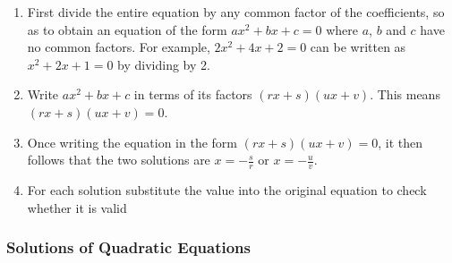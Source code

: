         
        \label{m39247*id150020}\begin{enumerate}[noitemsep, label=\textbf{\arabic*}. ] 
            \label{m39247*uid37}\item First divide the entire equation by any common factor of the coefficients,
so as to obtain an equation of the form \begin{math}a{x}^{2}+bx+c=0\end{math} where \begin{math}a\end{math}, \begin{math}b\end{math} and
\begin{math}c\end{math} have no common factors. For example, \begin{math}2{x}^{2}+4x+2=0\end{math}\hspace{1ex} can be written as
\begin{math}{x}^{2}+2x+1=0\end{math}\hspace{1ex} by dividing by 2.
\label{m39247*uid38}\item Write \begin{math}a{x}^{2}+bx+c\end{math} in terms of its factors \begin{math}\left(rx+s\right)\left(ux+v\right)\end{math}.
This means \begin{math}\left(rx+s\right)\left(ux+v\right)=0\end{math}.
\label{m39247*uid39}\item Once writing the equation in the form \begin{math}\left(rx+s\right)\left(ux+v\right)=0\end{math}, it then
follows that the two solutions are \begin{math}x=-\frac{s}{r}\end{math} or \begin{math}x=-\frac{u}{v}\end{math}.
\item For each solution substitute the value into the original equation to check whether it is valid\end{enumerate}
        
\label{m39247*secfhsst!!!underscore!!!id2128}
            \subsubsection{  Solutions of Quadratic Equations }
            \nopagebreak
            

